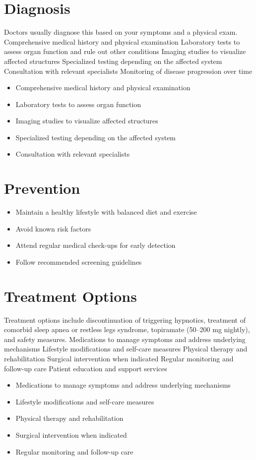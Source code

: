 \section{Diagnosis}
Doctors usually diagnose this based on your symptoms and a physical exam. Comprehensive medical history and physical examination Laboratory tests to assess organ function and rule out other conditions Imaging studies to visualize affected structures Specialized testing depending on the affected system Consultation with relevant specialists Monitoring of disease progression over time

\begin{itemize}[noitemsep]
  \item Comprehensive medical history and physical examination
  \item Laboratory tests to assess organ function
  \item Imaging studies to visualize affected structures
  \item Specialized testing depending on the affected system
  \item Consultation with relevant specialists
\end{itemize}
\section{Prevention}
\begin{itemize}[noitemsep]
  \item Maintain a healthy lifestyle with balanced diet and exercise
  \item Avoid known risk factors
  \item Attend regular medical check-ups for early detection
  \item Follow recommended screening guidelines
\end{itemize}
\section{Treatment Options}
Treatment options include discontinuation of triggering hypnotics, treatment of comorbid sleep apnea or restless legs syndrome, topiramate (50--200 mg nightly), and safety measures. Medications to manage symptoms and address underlying mechanisms Lifestyle modifications and self-care measures Physical therapy and rehabilitation Surgical intervention when indicated Regular monitoring and follow-up care Patient education and support services

\begin{itemize}[noitemsep]
  \item Medications to manage symptoms and address underlying mechanisms
  \item Lifestyle modifications and self-care measures
  \item Physical therapy and rehabilitation
  \item Surgical intervention when indicated
  \item Regular monitoring and follow-up care
\end{itemize}

